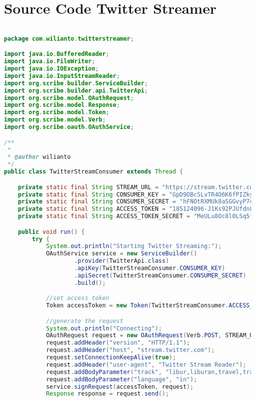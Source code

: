\chapter{Source Code Twitter Streamer}
\label{app:B}

\singlespacing 
%
%
\begin{lstlisting}[language=Java,basicstyle=\tiny,caption=TwitterStreamerConsumer.java]

package com.wilianto.twitterstreamer;

import java.io.BufferedReader;
import java.io.FileWriter;
import java.io.IOException;
import java.io.InputStreamReader;
import org.scribe.builder.ServiceBuilder;
import org.scribe.builder.api.TwitterApi;
import org.scribe.model.OAuthRequest;
import org.scribe.model.Response;
import org.scribe.model.Token;
import org.scribe.model.Verb;
import org.scribe.oauth.OAuthService;

/**
 *
 * @author wilianto
 */
public class TwitterStreamConsumer extends Thread {

    private static final String STREAM_URL = "https://stream.twitter.com/1.1/statuses/filter.json";
    private static final String CONSUMER_KEY = "GpD9OBcSLvTR4O6K6fPIZkyuh";
    private static final String CONSUMER_SECRET = "hFNOtRXMUk8aSGGvyP7cIYOz8B2yarnqrpipBujvtAkXIgdgnt";
    private static final String ACCESS_TOKEN = "185124096-J1Ks92PJUfdn8ULlROFqRuUtZnwao6iVhpufsUXT";
    private static final String ACCESS_TOKEN_SECRET = "MeULu8Oc8l0LSq5fmB5V0CpsWYYBCWdQenJPczpEqpeAp";

    public void run() {
        try {
            System.out.println("Starting Twitter Streaming:");
            OAuthService service = new ServiceBuilder()
                    .provider(TwitterApi.class)
                    .apiKey(TwitterStreamConsumer.CONSUMER_KEY)
                    .apiSecret(TwitterStreamConsumer.CONSUMER_SECRET)
                    .build();

            //set access token
            Token accessToken = new Token(TwitterStreamConsumer.ACCESS_TOKEN, TwitterStreamConsumer.ACCESS_TOKEN_SECRET);

            //generate the request
            System.out.println("Connecting");
            OAuthRequest request = new OAuthRequest(Verb.POST, STREAM_URL);
            request.addHeader("version", "HTTP/1.1");
            request.addHeader("host", "stream.twitter.com");
            request.setConnectionKeepAlive(true);
            request.addHeader("user-agent", "Twitter Stream Reader");
            request.addBodyParameter("track", "libur,liburan,travel,travelling,wisata,tour,pariwisata,destinasi,hotel,pesawat");
            request.addBodyParameter("language", "in");
            service.signRequest(accessToken, request);
            Response response = request.send();


\end{lstlisting}
